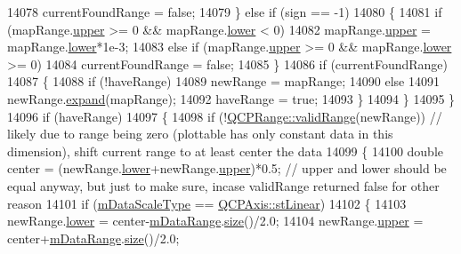 \begin{DoxyCode}
14078           currentFoundRange = \textcolor{keyword}{false};
14079       \} \textcolor{keywordflow}{else} \textcolor{keywordflow}{if} (sign == -1)
14080       \{
14081         \textcolor{keywordflow}{if} (mapRange.\hyperlink{class_q_c_p_range_ae44eb3aafe1d0e2ed34b499b6d2e074f}{upper} >= 0 && mapRange.\hyperlink{class_q_c_p_range_aa3aca3edb14f7ca0c85d912647b91745}{lower} < 0)
14082           mapRange.\hyperlink{class_q_c_p_range_ae44eb3aafe1d0e2ed34b499b6d2e074f}{upper} = mapRange.\hyperlink{class_q_c_p_range_aa3aca3edb14f7ca0c85d912647b91745}{lower}*1e-3;
14083         \textcolor{keywordflow}{else} \textcolor{keywordflow}{if} (mapRange.\hyperlink{class_q_c_p_range_ae44eb3aafe1d0e2ed34b499b6d2e074f}{upper} >= 0 && mapRange.\hyperlink{class_q_c_p_range_aa3aca3edb14f7ca0c85d912647b91745}{lower} >= 0)
14084           currentFoundRange = \textcolor{keyword}{false};
14085       \}
14086       \textcolor{keywordflow}{if} (currentFoundRange)
14087       \{
14088         \textcolor{keywordflow}{if} (!haveRange)
14089           newRange = mapRange;
14090         \textcolor{keywordflow}{else}
14091           newRange.\hyperlink{class_q_c_p_range_a0fa1bc8048be50d52bea93a8caf08305}{expand}(mapRange);
14092         haveRange = \textcolor{keyword}{true};
14093       \}
14094     \}
14095   \}
14096   \textcolor{keywordflow}{if} (haveRange)
14097   \{
14098     \textcolor{keywordflow}{if} (!\hyperlink{class_q_c_p_range_ab38bd4841c77c7bb86c9eea0f142dcc0}{QCPRange::validRange}(newRange)) \textcolor{comment}{// likely due to range being zero (plottable
       has only constant data in this dimension), shift current range to at least center the data}
14099     \{
14100       \textcolor{keywordtype}{double} center = (newRange.\hyperlink{class_q_c_p_range_aa3aca3edb14f7ca0c85d912647b91745}{lower}+newRange.\hyperlink{class_q_c_p_range_ae44eb3aafe1d0e2ed34b499b6d2e074f}{upper})*0.5; \textcolor{comment}{// upper and lower should be equal
       anyway, but just to make sure, incase validRange returned false for other reason}
14101       \textcolor{keywordflow}{if} (\hyperlink{class_q_c_p_color_scale_a2754d6a78736f64a241e333fbd955372}{mDataScaleType} == \hyperlink{class_q_c_p_axis_a36d8e8658dbaa179bf2aeb973db2d6f0aff6e30a11a828bc850caffab0ff994f6}{QCPAxis::stLinear})
14102       \{
14103         newRange.\hyperlink{class_q_c_p_range_aa3aca3edb14f7ca0c85d912647b91745}{lower} = center-\hyperlink{class_q_c_p_color_scale_a5d4853feb32cd0077bb2b871687c844b}{mDataRange}.\hyperlink{class_q_c_p_range_afa57c13049b965edb6fd1c00ac56338a}{size}()/2.0;
14104         newRange.\hyperlink{class_q_c_p_range_ae44eb3aafe1d0e2ed34b499b6d2e074f}{upper} = center+\hyperlink{class_q_c_p_color_scale_a5d4853feb32cd0077bb2b871687c844b}{mDataRange}.\hyperlink{class_q_c_p_range_afa57c13049b965edb6fd1c00ac56338a}{size}()/2.0;

\end{DoxyCode}

